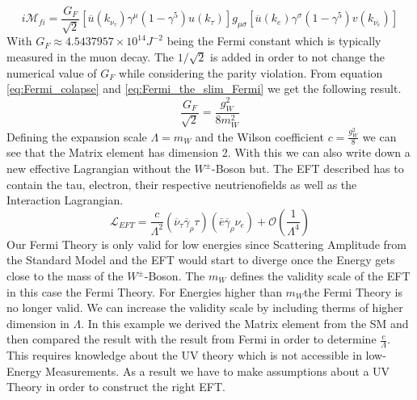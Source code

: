 \documentclass[../Bachelorarbeit.tex]{subfiles}
\begin{document}
\begin{equation}
    i\mathcal{M}_{fi} = \frac{G_{F}}{\sqrt{2}} \left[ \overline{u}(k_{\nu_{\tau}})\gamma^{\mu}(1-\gamma^{5})u(k_{\tau}) \right] g_{\mu\sigma} \left[ \overline{u}(k_{e})\gamma^{\sigma}(1-\gamma^{5})v(k_{\overline{\nu_{e}}}) \right]
    \label{eq:Fermi_the_slim_Fermi}
\end{equation}
With $G_{F} \approx 4.5437957\times 10^{14} J^{-2}$ being the Fermi constant which is typically measured in the muon decay. The $1/\sqrt{2}$ is added in order to not change the numerical value of $G_{F}$ while considering the parity violation.
From equation \ref{eq:Fermi_colapse} and \ref{eq:Fermi_the_slim_Fermi} we get the following result.
\begin{equation}
    \frac{G_{F}}{\sqrt{2}} = \frac{g_{W}^{2}}{8 m_{W}^{2}}
\end{equation}
Defining the expansion scale $\Lambda=m_{W}$ and the Wilson coefficient $c= \frac{g_{W}^{2}}{8}$ we can see that the Matrix element has dimension 2.
With this we can also write down a new effective Lagrangian without the $W^{\pm }$-Boson but. The EFT described has to contain the tau, electron, their respective neutrienofields
as well as the Interaction Lagrangian.
\begin{equation}
    \mathcal{L}_{EFT} = \frac{c}{\Lambda^{2}} \left( \overline{\nu}_{\tau} \overline{\gamma}_{\rho} \tau \right) \left(\bar{e} \overline{\gamma}_{\rho} \nu_{e} \right) + \mathcal{O}(\frac{1}{\Lambda^{4}})
\end{equation}
Our Fermi Theory is only valid for low energies since Scattering Amplitude from the Standard Model and the EFT would
start to diverge once the Energy gets close to the mass of the $W^{\pm}$-Boson.
The $m_{W}$ defines the validity scale of the EFT in this case the Fermi Theory. For Energies higher than $m_{W}$the
Fermi Theory is no longer valid. We can increase the validity scale by including therms of higher dimension in $\Lambda$.
In this example we derived the Matrix element from the SM and then compared the result with the result from Fermi in 
order to determine $\frac{c}{\Lambda}$. This requires knowledge about the UV theory which is not accessible in low-Energy
Measurements. As a result we have to make assumptions about a UV Theory in order to construct the right EFT.

%
\end{document}
